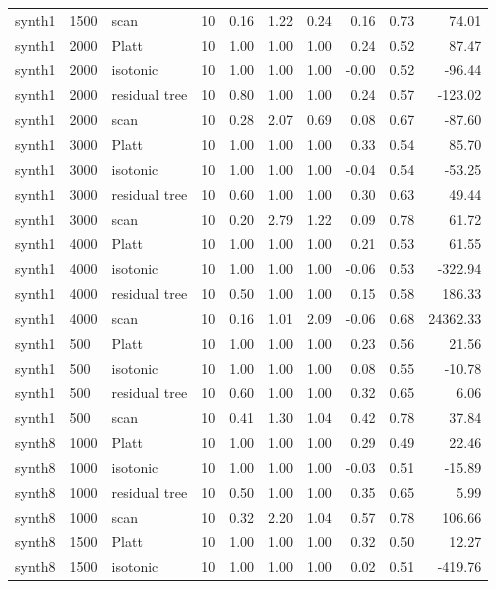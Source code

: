 \begin{tabular}{lllrrrrrrr}
synth1 & 1500 & scan & 10 & 0.16 & 1.22 & 0.24 & 0.16 & 0.73 & 74.01 \\
synth1 & 2000 & Platt & 10 & 1.00 & 1.00 & 1.00 & 0.24 & 0.52 & 87.47 \\
synth1 & 2000 & isotonic & 10 & 1.00 & 1.00 & 1.00 & -0.00 & 0.52 & -96.44 \\
synth1 & 2000 & residual tree & 10 & 0.80 & 1.00 & 1.00 & 0.24 & 0.57 & -123.02 \\
synth1 & 2000 & scan & 10 & 0.28 & 2.07 & 0.69 & 0.08 & 0.67 & -87.60 \\
synth1 & 3000 & Platt & 10 & 1.00 & 1.00 & 1.00 & 0.33 & 0.54 & 85.70 \\
synth1 & 3000 & isotonic & 10 & 1.00 & 1.00 & 1.00 & -0.04 & 0.54 & -53.25 \\
synth1 & 3000 & residual tree & 10 & 0.60 & 1.00 & 1.00 & 0.30 & 0.63 & 49.44 \\
synth1 & 3000 & scan & 10 & 0.20 & 2.79 & 1.22 & 0.09 & 0.78 & 61.72 \\
synth1 & 4000 & Platt & 10 & 1.00 & 1.00 & 1.00 & 0.21 & 0.53 & 61.55 \\
synth1 & 4000 & isotonic & 10 & 1.00 & 1.00 & 1.00 & -0.06 & 0.53 & -322.94 \\
synth1 & 4000 & residual tree & 10 & 0.50 & 1.00 & 1.00 & 0.15 & 0.58 & 186.33 \\
synth1 & 4000 & scan & 10 & 0.16 & 1.01 & 2.09 & -0.06 & 0.68 & 24362.33 \\
synth1 & 500 & Platt & 10 & 1.00 & 1.00 & 1.00 & 0.23 & 0.56 & 21.56 \\
synth1 & 500 & isotonic & 10 & 1.00 & 1.00 & 1.00 & 0.08 & 0.55 & -10.78 \\
synth1 & 500 & residual tree & 10 & 0.60 & 1.00 & 1.00 & 0.32 & 0.65 & 6.06 \\
synth1 & 500 & scan & 10 & 0.41 & 1.30 & 1.04 & 0.42 & 0.78 & 37.84 \\
synth8 & 1000 & Platt & 10 & 1.00 & 1.00 & 1.00 & 0.29 & 0.49 & 22.46 \\
synth8 & 1000 & isotonic & 10 & 1.00 & 1.00 & 1.00 & -0.03 & 0.51 & -15.89 \\
synth8 & 1000 & residual tree & 10 & 0.50 & 1.00 & 1.00 & 0.35 & 0.65 & 5.99 \\
synth8 & 1000 & scan & 10 & 0.32 & 2.20 & 1.04 & 0.57 & 0.78 & 106.66 \\
synth8 & 1500 & Platt & 10 & 1.00 & 1.00 & 1.00 & 0.32 & 0.50 & 12.27 \\
synth8 & 1500 & isotonic & 10 & 1.00 & 1.00 & 1.00 & 0.02 & 0.51 & -419.76 \\

\end{tabular}
